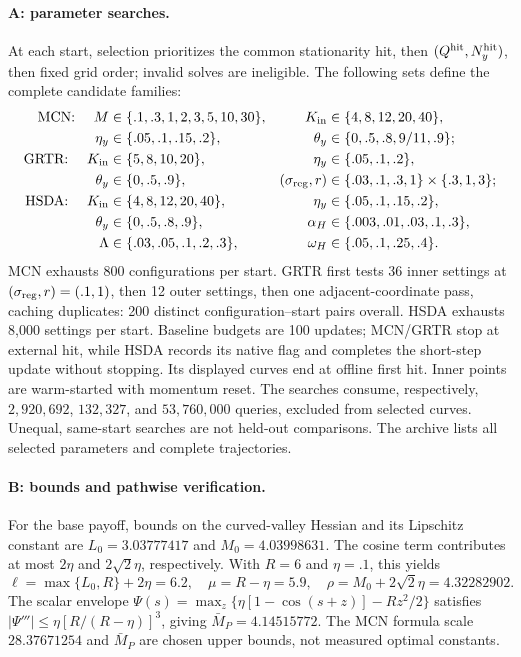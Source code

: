\paragraph{A: parameter searches.}
\label{app:exp-a}
At each start, selection prioritizes the common stationarity hit, then
$(Q^{\rm hit},N_y^{\rm hit})$, then fixed grid order; invalid solves are
ineligible. The following sets define the complete candidate families:
\begin{align*}
\text{MCN: }\quad M&\in\{.1,.3,1,2,3,5,10,30\},&
K_{\rm in}&\in\{4,8,12,20,40\},\\
\eta_y&\in\{.05,.1,.15,.2\},&
\theta_y&\in\{0,.5,.8,9/11,.9\};\\
\text{GRTR: }\quad K_{\rm in}&\in\{5,8,10,20\},&
\eta_y&\in\{.05,.1,.2\},\\
\theta_y&\in\{0,.5,.9\},&
(\sigma_{\rm reg},r)&\in\{.03,.1,.3,1\}\times\{.3,1,3\};\\
\text{HSDA: }\quad K_{\rm in}&\in\{4,8,12,20,40\},&
\eta_y&\in\{.05,.1,.15,.2\},\\
\theta_y&\in\{0,.5,.8,.9\},&
\alpha_H&\in\{.003,.01,.03,.1,.3\},\\
\Lambda&\in\{.03,.05,.1,.2,.3\},&
\omega_H&\in\{.05,.1,.25,.4\}.
\end{align*}
MCN exhausts 800 configurations per start. GRTR first tests 36 inner
settings at $(\sigma_{\rm reg},r)=(.1,1)$, then 12 outer settings, then
one adjacent-coordinate pass, caching duplicates: 200 distinct
configuration--start pairs overall. HSDA exhausts 8,000 settings per
start. Baseline budgets are 100 updates; MCN/GRTR stop at external
hit, while HSDA records its native flag and completes the short-step
update without stopping. Its displayed curves end at offline first hit.
Inner points are warm-started with momentum reset. The searches consume,
respectively, $2{,}920{,}692$, $132{,}327$, and $53{,}760{,}000$ queries,
excluded from selected curves. Unequal, same-start searches are not
held-out comparisons. The archive lists all selected parameters and
complete trajectories.

\paragraph{B: bounds and pathwise verification.}
\label{app:exp-b}
\label{app:exp-b-constants}
For the base payoff, bounds on the curved-valley Hessian and its
Lipschitz constant are $L_0=3.03777417$ and $M_0=4.03998631$.
The cosine term contributes at most $2\eta$ and $2\sqrt2\eta$,
respectively. With $R=6$ and $\eta=.1$, this yields
\[
 \ell=\max\{L_0,R\}+2\eta=6.2,\quad \mu=R-\eta=5.9,\quad
 \rho=M_0+2\sqrt2\eta=4.32282902.
\]
The scalar envelope
$\Psi(s)=\max_z\{\eta[1-\cos(s+z)]-Rz^2/2\}$ satisfies
$|\Psi'''|\le\eta[R/(R-\eta)]^3$, giving
$\bar M_P=4.14515772$. The MCN formula scale $28.37671254$ and
$\bar M_P$ are chosen upper bounds, not measured optimal constants.

